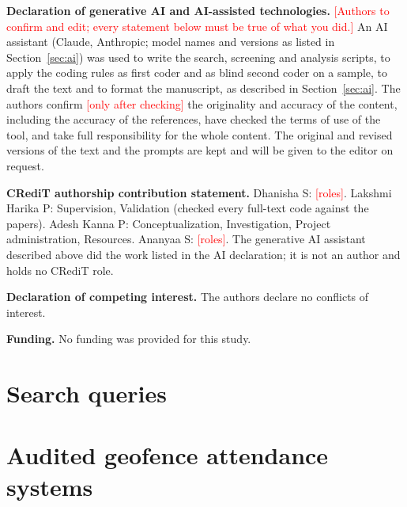 \documentclass[preprint,12pt]{elsarticle}
\newcommand{\todo}[1]{\textcolor{red}{[#1]}}
\begin{document}
\noindent\textbf{Declaration of generative AI and AI-assisted technologies.} \todo{Authors to confirm and edit; every statement below must be true of what you did.} An AI assistant (Claude, Anthropic; model names and versions as listed in Section~\ref{sec:ai}) was used to write the search, screening and analysis scripts, to apply the coding rules as first coder and as blind second coder on a sample, to draft the text and to format the manuscript, as described in Section~\ref{sec:ai}. The authors confirm \todo{only after checking} the originality and accuracy of the content, including the accuracy of the references, have checked the terms of use of the tool, and take full responsibility for the whole content. The original and revised versions of the text and the prompts are kept and will be given to the editor on request.

\noindent\textbf{CRediT authorship contribution statement.} Dhanisha S: \todo{roles}. Lakshmi Harika P: Supervision, Validation (checked every full-text code against the papers). Adesh Kanna P: Conceptualization, Investigation, Project administration, Resources. Ananyaa S: \todo{roles}. The generative AI assistant described above did the work listed in the AI declaration; it is not an author and holds no CRediT role.

\noindent\textbf{Declaration of competing interest.} The authors declare no conflicts of interest.

\noindent\textbf{Funding.} No funding was provided for this study.

\appendix
\section{Search queries}\label{app:queries}


\section{Audited geofence attendance systems}\label{app:audit}




\end{document}
